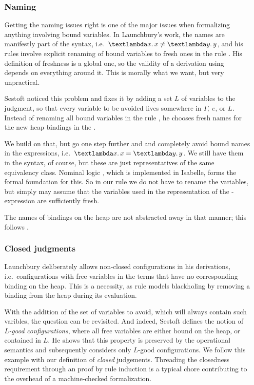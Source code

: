 \documentclass{jfp1}
\theoremstyle{nonumberbreak}
\newcommand{\keyword}[1]{\text{\textsf{#1}}}
\newcommand{\sLam}[2]{\text{\textlambda} #1.\, #2}
\newcommand{\sRule}[1]{\text{{\textsc{#1}}}}
\begin{document}
\subsubsection{Naming}

Getting the naming issues right is one of the major issues when formalizing anything involving bound variables. In Launchbury's work, the names are manifestly part of the syntax, i.e.\ $\sLam x x \ne \sLam y y$, and his rules involve explicit renaming of bound variables to fresh ones in the rule \sRule{Var}. His definition of freshness is a global one, so the validity of a derivation using \sRule{Var} depends on everything around it. This is morally what we want, but very unpractical.

Sestoft  noticed this problem and fixes it by adding a set $L$ of variables to the judgment, so that every variable to be avoided lives somewhere in $\Gamma$, $e$, or $L$. Instead of renaming all bound variables in the rule \sRule{Var}, he chooses fresh names for the new heap bindings in the \sRule{Let}.

We build on that, but go one step further and and completely avoid bound names in the expressions, i.e.\ $\sLam x x = \sLam y y$. We still have them in the syntax, of course, but these are just representatives of the same equivalency class. Nominal logic \cite{nominal}, which is implemented in Isabelle, forms the formal foundation for this. So in our rule \sRule{Let} we do not have to rename the variables, but simply may assume that the variables used in the representation of the \keyword{let}-expression are sufficiently fresh.

The names of bindings on the heap are not abstracted away in that manner; this follows \cite{nameless}.

\subsubsection{Closed judgments}

Launchbury deliberately allows non-closed configurations in his derivations, i.e.\ configurations with free variables in the terms that have no corresponding binding on the heap. This is a necessity, as rule \sRule{Var} models blackholing by removing a binding from the heap during its evaluation.

With the addition of the set of variables to avoid, which will always contain such varibles, the question can be revisited. And indeed, Sestoft defines the notion of \emph{$L$-good configurations}, where all free variables are either bound on the heap, or contained in $L$. He shows that this property is preserved by the operational semantics and subsequently considers only $L$-good configurations. We follow this example with our definition of \emph{closed} judgements. Threading the closedness requirement through an proof by rule induction is a typical chore contributing to the overhead of a machine-checked formalization.
\end{document}
